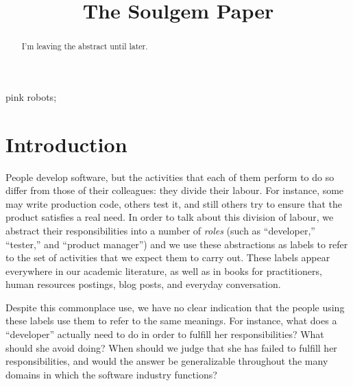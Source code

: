 \documentclass[10pt, conference, compsocconf]{IEEEtran}
\begin{document}
\title{The Soulgem Paper}

\author{
}

\maketitle


\begin{abstract}

I'm leaving the abstract until later.

\end{abstract}

\begin{IEEEkeywords}
pink robots;
\end{IEEEkeywords}


\section{Introduction}

People develop software, but the activities that each of them perform to do so differ from those of their colleagues: they divide their labour. For instance, some may write production code, others test it, and still others try to ensure that the product satisfies a real need. In order to talk about this division of labour, we abstract their responsibilities into a number of \emph{roles} (such as ``developer,'' ``tester,'' and ``product manager'') and we use these abstractions as labels to refer to the set of activities that we expect them to carry out. These labels appear everywhere in our academic literature, as well as in books for practitioners, human resources postings, blog posts, and everyday conversation.

Despite this commonplace use, we have no clear indication that the people using these labels use them to refer to the same meanings. For instance, what does a ``developer'' actually need to do in order to fulfill her responsibilities? What should she avoid doing? When should we judge that she has failed to fulfill her responsibilities, and would the answer be generalizable throughout the many domains in which the software industry functions?
\end{document}

